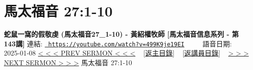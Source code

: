 \documentclass{book}
\begin{document}
\section{馬太福音 27:1-10}
\label{sec:499K9je19EI}
\textbf{蛇鼠一窩的假敬虔 (馬太福音27\_1-10) -  黃紹權牧師 [馬太福音信息系列 - 第143講]}
\newline
\newline
連結: \href{https://youtube.com/watch?v=499K9je19EI}{\texttt{ https://youtube.com/watch?v=499K9je19EI}} ~~~~ 語音日期: 2025-01-08 
\newline
\newline
\hyperref[sec:lTGVgidxHms]{< < < PREV SERMON < < <}
~
\hyperlink{toc}{[返主目錄]}
~
\hyperref[ch:preacher10]{[返講員目錄]}
~
\hyperref[sec:ZN4O4BAmHMA]{> > > NEXT SERMON > > >}
\newline
\newline
馬太福音 27:1-10
\newline
\end{document}
